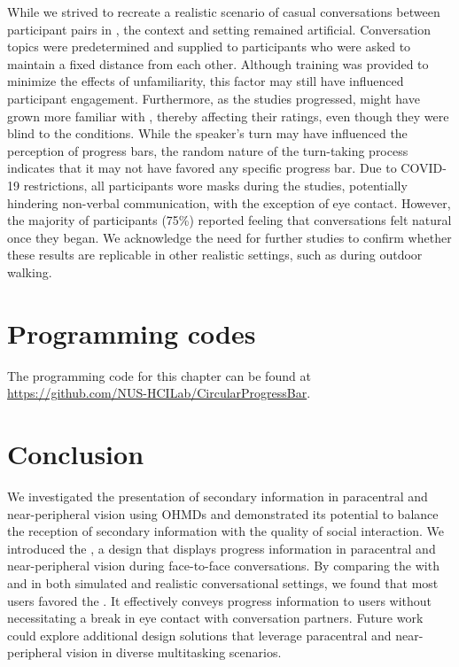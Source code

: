 While we strived to recreate a realistic scenario of casual conversations between participant pairs in \studytwo{}, the context and setting remained artificial. Conversation topics were predetermined and supplied to participants who were asked to maintain a fixed distance from each other. Although training was provided to minimize the effects of unfamiliarity, this factor may still have influenced participant engagement. Furthermore, as the studies progressed,  might have grown more familiar with \studytwo{}, thereby affecting their ratings, even though they were blind to the conditions. While the speaker's turn may have influenced the perception of progress bars, the random nature of the turn-taking process indicates that it may not have favored any specific progress bar. Due to COVID-19 restrictions, all participants wore masks during the studies, potentially hindering non-verbal communication, with the exception of eye contact. However, the majority of participants (75\%) reported feeling that conversations felt natural once they began. We acknowledge the need for further studies to confirm whether these results are replicable in other realistic settings, such as during outdoor walking.











\section{Programming codes}
\label{sec:Progressbar:programming_codes}

\begin{sloppypar}
  The programming code for this chapter can be found at \url{https://github.com/NUS-HCILab/CircularProgressBar}.
\end{sloppypar}


\section{Conclusion}

We investigated the presentation of secondary information in paracentral and near-peripheral vision using OHMDs and demonstrated its potential to balance the reception of secondary information with the quality of social interaction. We introduced the \circularbar{}, a design that displays progress information in paracentral and near-peripheral vision during face-to-face conversations. By comparing the \circularbar{} with \linearbar{} and \textbar{} in both simulated and realistic conversational settings, we found that most users favored the \circularbar{}. It effectively conveys progress information to users without necessitating a break in eye contact with conversation partners. Future work could explore additional design solutions that leverage paracentral and near-peripheral vision in diverse multitasking scenarios.

